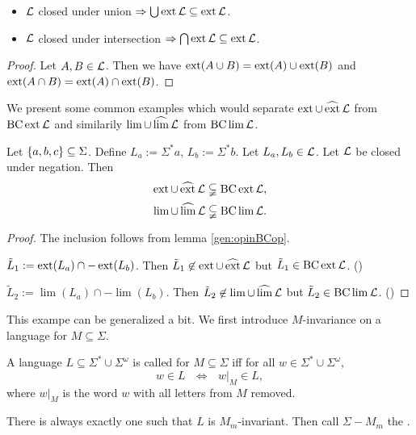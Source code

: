 \begin{lemma}
\begin{itemize}
\item
$\mathcal{L}$ closed under union $\Rightarrow \bigcup \operatorname{ext} \mathcal{L} \subseteq \operatorname{ext} \mathcal{L}$.
\item
$\mathcal{L}$ closed under intersection $\Rightarrow \bigcap \operatorname{ext} \mathcal{L} \subseteq \operatorname{ext} \mathcal{L}$.
\end{itemize}
\begin{proof}
Let $A,B \in \mathcal{L}$. Then we have $\operatorname{ext}(A\cup B) = \operatorname{ext}(A) \cup \operatorname{ext}(B)$ and $\operatorname{ext}(A\cap B) = \operatorname{ext}(A) \cap \operatorname{ext}(B)$.
\end{proof}
\end{lemma}

We present some common examples which would separate $\operatorname{ext}\cup\operatorname{\widehat{ext}} \mathcal{L}$ from $\operatorname{BC} \operatorname{ext} \mathcal{L}$ and similarily $\lim\cup\operatorname{\widehat{lim}} \mathcal{L}$ from $\operatorname{BC} \lim \mathcal{L}$.

\begin{example}
\label{gen:example:extBCextSeparate}
Let $\Set{a,b,c} \subseteq \Sigma$. Define $L_a := \Sigma^*a$, $L_b := \Sigma^*b$. Let $L_a,L_b \in \mathcal{L}$. Let $\mathcal{L}$ be closed under negation. Then
\[ \operatorname{ext} \cup \operatorname{\widehat{ext}} \mathcal{L} \subsetneqq \operatorname{BC} \operatorname{ext} \mathcal{L} , \]
\[ \lim \cup \operatorname{\widehat{lim}} \mathcal{L} \subsetneqq \operatorname{BC} \lim \mathcal{L} . \]
\begin{proof}
The inclusion follows from lemma \ref{gen:opinBCop}.

$\tilde L_1 := \operatorname{ext}(L_a) \cap -\operatorname{ext}(L_b)$. Then $\tilde L_1 \not\in \operatorname{ext} \cup \operatorname{\widehat{ext}} \mathcal{L}$ but $\tilde L_1 \in \operatorname{BC} \operatorname{ext} \mathcal{L}$. ()

$\tilde L_2 := \lim(L_a) \cap -\lim(L_b)$. Then $\tilde L_2 \not\in \lim \cup \operatorname{\widehat{lim}} \mathcal{L}$ but $\tilde L_2 \in \operatorname{BC} \lim \mathcal{L}$. ()
\end{proof}
\end{example}

This exampe can be generalized a bit. We first introduce $M$-invariance on a language for $M\subseteq\Sigma$.

\begin{mydef}
A language $L \subseteq \Sigma^* \cup \Sigma^\omega$ is called  for $M \subseteq\Sigma$ iff for all $w \in \Sigma^* \cup \Sigma^\omega$,
\[ w \in L \ \ \ \Leftrightarrow \ \ \  w |_M \in L , \]
where $w|_M$ is the word $w$ with all letters from $M$ removed.

There is always exactly one  such that $L$ is $M_m$-invariant. Then call $\Sigma-M_m$ the .
\end{mydef}

